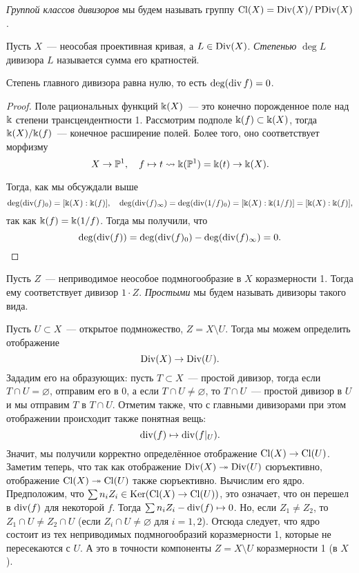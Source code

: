 	\begin{definition} 
		\emph{Группой классов дивизоров} мы будем называть группу $\operatorname{Cl}(X) = \operatorname{Div}(X)/\operatorname{PDiv}(X)$.
	\end{definition}

	\begin{definition} 
		Пусть $X$~--- неособая проективная кривая, а $L \in \operatorname{Div}(X)$. \emph{Степенью} $\deg{L}$ дивизора $L$ называется сумма его кратностей.  
	\end{definition}

	\begin{statement} 
		Степень главного дивизора равна нулю, то есть $\deg(\operatorname{div}{f}) = 0$.
	\end{statement}

	\begin{proof}
		Поле рациональных функций $\Bbbk(X)$~--- это конечно порожденное поле над $\Bbbk$ степени трансцендентности 1. Рассмотрим подполе $\Bbbk(f) \subset \Bbbk(X)$, тогда $\Bbbk(X)/\Bbbk(f)$~--- конечное расширение полей. Более того, оно соответствует морфизму 
		\[
	 		X \to \mathbb{P}^1, \quad f \mapsto t \rightsquigarrow \Bbbk(\mathbb{P}^1) = \Bbbk(t) \to \Bbbk(X). 
	 	\] 	

	 	Тогда, как мы обсуждали выше
	 	\[
	 		\deg(\operatorname{div}(f)_0) = [\Bbbk(X) : \Bbbk(f)], \quad \deg(\operatorname{div}(f)_{\infty})  = \deg(\operatorname{div}(1/f)_0) = [\Bbbk(X) : \Bbbk(1/f)] = [\Bbbk(X) : \Bbbk(f)],
	 	\]
	 	так как $\Bbbk(f) = \Bbbk(1/f)$. Тогда мы получили, что 
	 	\[
	 		\deg(\operatorname{div}(f)) = \deg(\operatorname{div}(f)_0) - \deg(\operatorname{div}(f)_{\infty}) = 0.
	 	\]

	\end{proof}

	\begin{definition} 
		Пусть $Z$~--- неприводимое неособое подмногообразие в $X$ коразмерности 1. Тогда ему соответствует дивизор $1 \cdot Z$. \emph{Простыми} мы будем называть дивизоры такого вида. 
	\end{definition}

	Пусть $U \subset X$~--- открытое подмножество, $Z = X \setminus U$.  Тогда мы можем определить отображение 
	\[
		\operatorname{Div}(X) \to \operatorname{Div}(U).
	\] 
	Зададим его на образующих: пусть $T \subset X$~--- простой дивизор, тогда если $T \cap U = \varnothing$, отправим его в 0, а если $T \cap U \neq \varnothing$, то $T \cap U$~--- простой дивизор в $U$ и мы отправим $T$ в  $T \cap U$. Отметим также, что с главными дивизорами при этом отображении происходит также понятная вещь: 
	\[
		\operatorname{div}(f) \mapsto \operatorname{div}(f\vert_U).
	\]
	Значит, мы получили корректно определённое отображение $\operatorname{Cl}(X) \to \operatorname{Cl}(U)$. Заметим теперь, что так как отображение $\operatorname{Div}(X) \twoheadrightarrow \operatorname{Div}(U)$ сюръективно, отображение $\operatorname{Cl}(X) \twoheadrightarrow \operatorname{Cl}(U)$ также сюръективно. Вычислим его ядро. Предположим, что $\sum n_i Z_i \in \Ker\lr*{\Cl(X) \to \Cl(U)}$, это означает, что он перешел в $\operatorname{div}(f)$ для некоторой $f$. Тогда $\sum n_i Z_i - \operatorname{div}(f) \mapsto 0$. Но, если $Z_1 \neq Z_2$, то $Z_1 \cap U \neq Z_2 \cap U$ (если $Z_i \cap U \neq \varnothing$ для $i = 1, 2$). Отсюда следует, что ядро состоит из тех неприводимых подмногообразий коразмерности 1, которые не пересекаются с $U$. А это в точности компоненты $Z = X \setminus U$ коразмерности 1 (в $X$). 

